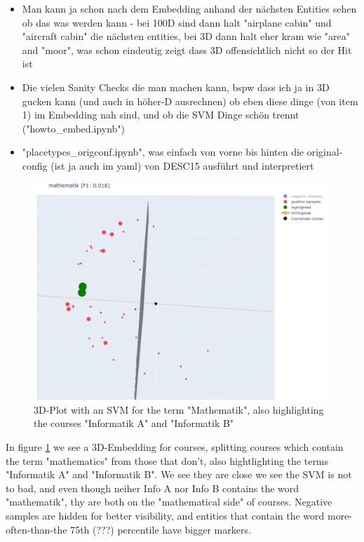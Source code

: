 \documentclass[11pt,
  paper=a4, 
  hidelinks,
  bibliography=totocnumbered,
	captions=tableheading,
	BCOR=10mm
]{scrreprt}
\theoremstyle{definition}
\def \figwidth {0.9\linewidth}
\begin{document}
\begin{itemize}
	\item  Man kann ja schon nach dem Embedding anhand der nächsten Entities sehen ob das was werden kann - bei 100D sind dann halt "airplane cabin" und "aircraft cabin" die nächsten entities, bei 3D dann halt eher kram wie "area" and "moor", was schon eindeutig zeigt dass 3D offensichtlich nicht so der Hit ist
	\item Die vielen Sanity Checks die man machen kann, bspw dass ich ja in 3D gucken kann (und auch in höher-D ausrechnen) ob eben diese dinge (von item 1) im Embedding nah sind, und ob die SVM Dinge schön trennt ("howto_embed.ipynb")
	\item "placetypes_origconf.ipynb", was einfach von vorne bis hinten die original-config (ist ja auch im yaml) von DESC15 ausführt und interpretiert	
\end{itemize}

\begin{figure}[H]
	\centering
	\includegraphics[width=\figwidth]{svm_mathematik_highlight_infoAB.png}
	\caption[3D-Plot with an SVM for the term "Mathematik"]{
		\label{fig:3dplot_mathe_infoab}
		3D-Plot with an SVM for the term "Mathematik", also highlighting the courses "Informatik A" and "Informatik B"
	}
\end{figure}

In figure \ref{fig:3dplot_mathe_infoab} we see a 3D-Embedding for courses, splitting courses which contain the term "mathematics" from those that don't, also hightlighting the terms "Informatik A" and "Informatik B". We see they are close we see the SVM is not to bad, and even though neiher Info A nor Info B contains the word "mathematik", thy are both on the "mathematical side" of courses. Negative samples are hidden for better visibility, and entities that contain the word more-often-than-the 75th (???) percentile have bigger markers.
\end{document}
